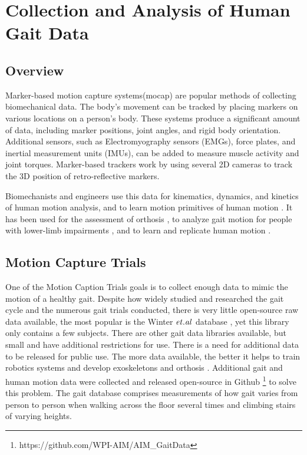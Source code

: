 \chapter{Collection and Analysis of Human Gait Data}
\label{chap:gaitdata}
\section{Overview}

Marker-based motion capture systems(mocap) are popular methods of collecting biomechanical data. The body's movement can be tracked by placing markers on various locations on a person's body. These systems produce a significant amount of data, including marker positions, joint angles, and rigid body orientation. Additional sensors, such as Electromyography sensors (EMGs), force plates, and inertial measurement units (IMUs), can be added to measure muscle activity and joint torques. Marker-based trackers work by using several 2D cameras to track the 3D position of retro-reflective markers. 

Biomechanists and engineers use this data for kinematics, dynamics, and kinetics of human motion analysis, and to learn motion primitives of human motion \cite{10.7717/peerj.918}. It has been used for the assessment of orthosis \cite{kobetic2009development},  to analyze gait motion for people with lower-limb impairments \cite{lauer2005application} \cite{hicks2011lower}  \cite{cutler2015using} , and to learn and replicate human motion \cite{ott2008motion} \cite{chalodhorn2007learning}.



\section{Motion Capture Trials}

One of the Motion Caption Trials goals is to collect enough data to mimic the motion of a healthy gait.  Despite how widely studied and researched the gait cycle and the numerous gait trials conducted, there is very little open-source raw data available, the most popular is the Winter $\it{et. al}$ database \cite{winter1991biomechanics}, yet this library only contains a few subjects. There are other gait data libraries available, but small and have additional restrictions for use. There is a need for additional data to be released for public use. The more data available, the better it helps to train robotics systems and develop exoskeletons and orthosis \cite{moore2015elaborate}. Additional gait and human motion data were collected and released open-source in Github \footnote{https://github.com/WPI-AIM/AIM\_GaitData} to solve this problem. The gait database comprises measurements of how gait varies from person to person when walking across the floor several times and climbing stairs of varying heights. 


